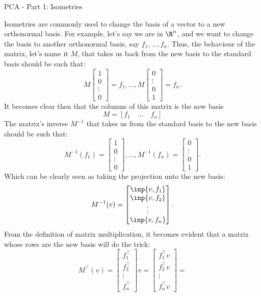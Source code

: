 \begin{entry}[2]{PCA - Part 1: Isometries }
\begin{entrysection}
\noindent Isometries are commonly used to change the basis of a vector to a new orthonormal basis. For example, let's say we are in $\R^n$, and we want to change the basis to another orthonormal basis, say 
$f_1, \ldots, f_n.$
Thus, the behaviour of the matrix, let's name it $M$, that takes us back from the new basis to the standard basis should be such that:
\[ M\begin{bmatrix}1 \\ 0 \\ \vdots \\ 0\end{bmatrix} = f_1,  \ldots,  M\begin{bmatrix}0 \\ \vdots \\ 0\\ 1\end{bmatrix} = f_n. \]
It becomes clear then that the columns of this matrix is the new basis
\[ M = [f_1 \quad \ldots \quad f_n]\] 
The matrix's inverse $M^{-1}$ that takes us from the standard basis to the new basis should be such that:
\[ M^{-1}(f_1) = \begin{bmatrix}1 \\ 0 \\ \vdots \\ 0\end{bmatrix}, \ldots,  M^{-1}(f_n) = \begin{bmatrix}0 \\ \vdots \\ 0\\ 1\end{bmatrix}. \]
Which can be clearly seen as taking the projection unto the new basis:
\[ M^{-1}(v) =  \begin{bmatrix}\inp{v, f_1}\\\inp{v, f_2}\\\vdots\\\inp{v, f_n} \end{bmatrix}.\]
From the definition of matrix multiplication, it becomes evident that a matrix whose rows are the new basis will do the trick:
\[  M^{\intercal}(v) = \begin{bmatrix} f_1^\intercal\\ f_2^\intercal\\\vdots\\ f_n^\intercal \end{bmatrix}v = \begin{bmatrix}f_1^\intercal v\\f_2^\intercal v\\\vdots\\f_n^\intercal v \end{bmatrix} = 
\]
\end{entrysection}
\end{entry}
